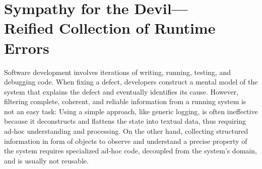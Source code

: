 







\chapter{Sympathy for the Devil---\\Reified Collection of Runtime Errors}


Software development involves iterations of writing, running, testing, and debugging code. When fixing a defect, developers construct a mental model of the system that explains the defect and eventually identifies its cause. However, filtering complete, coherent, and reliable information from a running system is not an easy task: Using a simple approach, like generic logging, is often ineffective because it deconstructs and flattens the state into textual data, thus requiring ad-hoc understanding and processing. On the other hand, collecting structured information in form of objects to observe and understand a precise property of the system requires specialized ad-hoc code, decoupled from the system's domain, and is usually not reusable.

